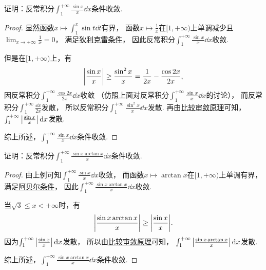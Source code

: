 \begin{example}
证明：反常积分\(\int_1^{+\infty} \frac{\sin x}{x} \dd{x}\)条件收敛.
\begin{proof}
显然函数\(x \mapsto \int_1^x \sin t \dd{t}\)有界，
函数\(x \mapsto \frac1x\)在\([1,+\infty)\)上单调减少且\(\lim_{x\to+\infty} \frac1x = 0\)，
满足\hyperref[theorem:反常积分.无穷限的反常积分的阿贝尔--狄利克雷审敛法]{狄利克雷条件}，
因此反常积分\(\int_1^{+\infty} \frac{\sin x}{x} \dd{x}\)收敛.

但是在\([1,+\infty)\)上，有\[
	\abs{\frac{\sin x}{x}}
	\geq \frac{\sin^2x}{x}
	= \frac1{2x} - \frac{\cos2x}{2x},
\]
因反常积分\(\int_1^{+\infty} \frac{\cos2x}{2x} \dd{x}\)收敛
（仿照上面对反常积分\(\int_1^{+\infty} \frac{\sin x}{x} \dd{x}\)的讨论），
而反常积分\(\int_1^{+\infty} \frac{\dd{x}}{2x}\)发散，
所以反常积分\(\int_1^{+\infty} \frac{\sin^2x}{x} \dd{x}\)发散.
再由\hyperref[theorem:定积分.无穷限反常积分的比较审敛原理]{比较审敛原理}可知，
\(\int_1^{+\infty} \abs{\frac{\sin x}{x}} \dd{x}\)发散.

综上所述，\(\int_1^{+\infty} \frac{\sin x}{x} \dd{x}\)条件收敛.
\end{proof}
\end{example}
\begin{example}
证明：反常积分\(\int_1^{+\infty} \frac{\sin x \arctan x}{x} \dd{x}\)条件收敛.
\begin{proof}
由上例可知\(\int_1^{+\infty} \frac{\sin x}{x} \dd{x}\)收敛，
而函数\(x \mapsto \arctan x\)在\([1,+\infty)\)上单调有界，
满足\hyperref[theorem:反常积分.无穷限的反常积分的阿贝尔--狄利克雷审敛法]{阿贝尔条件}，
因此\(\int_1^{+\infty} \frac{\sin x \arctan x}{x} \dd{x}\)收敛.

当\(\sqrt3 \leq x < +\infty\)时，有\[
	\abs{\frac{\sin x \arctan x}{x}}
	\geq \abs{\frac{\sin x}{x}}.
\]
因为\(\int_1^{+\infty} \abs{\frac{\sin x}{x}} \dd{x}\)发散，
所以由\hyperref[theorem:定积分.无穷限反常积分的比较审敛原理]{比较审敛原理}可知，
\(\int_1^{+\infty} \abs{\frac{\sin x \arctan x}{x}} \dd{x}\)发散.

综上所述，\(\int_1^{+\infty} \frac{\sin x \arctan x}{x} \dd{x}\)条件收敛.
\end{proof}
\end{example}

